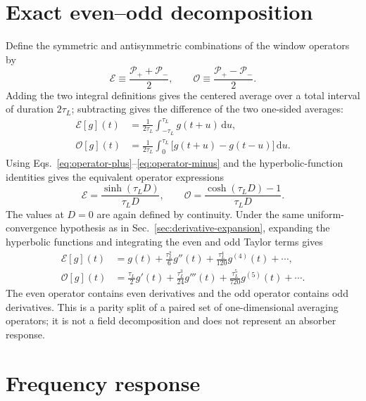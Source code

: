 \documentclass[12pt]{article}
\begin{document}
\section{Exact even--odd decomposition}

Define the symmetric and antisymmetric combinations of the window operators by
\begin{equation}
  \mathcal{E}\equiv\frac{\mathcal{P}_{+}+\mathcal{P}_{-}}{2},
  \qquad
  \mathcal{O}\equiv\frac{\mathcal{P}_{+}-\mathcal{P}_{-}}{2}.
  \label{eq:even-odd-definitions}
\end{equation}
Adding the two integral definitions gives the centered average over a total interval of duration $2\tau_L$; subtracting gives the difference of the two one-sided averages:
\begin{align}
  \mathcal{E}[g](t)
  &=\frac{1}{2\tau_L}\int_{-\tau_L}^{\tau_L}g(t+u)\,\mathrm{d}u,
  \label{eq:even-integral}\\
  \mathcal{O}[g](t)
  &=\frac{1}{2\tau_L}\int_0^{\tau_L}
    \bigl[g(t+u)-g(t-u)\bigr]\,\mathrm{d}u.
  \label{eq:odd-integral}
\end{align}
Using Eqs.~\eqref{eq:operator-plus}--\eqref{eq:operator-minus} and the hyperbolic-function identities gives the equivalent operator expressions
\begin{equation}
  \mathcal{E}=\frac{\sinh(\tau_LD)}{\tau_LD},
  \qquad
  \mathcal{O}=\frac{\cosh(\tau_LD)-1}{\tau_LD}.
  \label{eq:hyperbolic-split}
\end{equation}
The values at $D=0$ are again defined by continuity. Under the same uniform-convergence hypothesis as in Sec.~\ref{sec:derivative-expansion}, expanding the hyperbolic functions and integrating the even and odd Taylor terms gives
\begin{align}
  \mathcal{E}[g](t)
  &=g(t)+\frac{\tau_L^2}{6}g''(t)
    +\frac{\tau_L^4}{120}g^{(4)}(t)+\cdots,
  \label{eq:even-series}\\
  \mathcal{O}[g](t)
  &=\frac{\tau_L}{2}g'(t)
    +\frac{\tau_L^3}{24}g'''(t)
    +\frac{\tau_L^5}{720}g^{(5)}(t)+\cdots.
  \label{eq:odd-series}
\end{align}
The even operator contains even derivatives and the odd operator contains odd derivatives. This is a parity split of a paired set of one-dimensional averaging operators; it is not a field decomposition and does not represent an absorber response.

\section{Frequency response}
\end{document}
